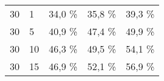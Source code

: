 \begin{table}[!htb]
\begin{tabular}{lllll}
                                                                             &                                                                                                                               &                                                                                                                       &                                                                                                                        &                                                                                                                        \\ \hline
\multicolumn{1}{|l|}{30}                                                     & \multicolumn{1}{l|}{1}                                                                                                        & \multicolumn{1}{l|}{34,0 \%}                                                                                          & \multicolumn{1}{l|}{35,8 \%}                                                                                           & \multicolumn{1}{l|}{39,3 \%}                                                                                           \\ \hline
\multicolumn{1}{|l|}{30}                                                     & \multicolumn{1}{l|}{5}                                                                                                        & \multicolumn{1}{l|}{40,9 \%}                                                                                          & \multicolumn{1}{l|}{47,4 \%}                                                                                           & \multicolumn{1}{l|}{49,9 \%}                                                                                           \\ \hline
\multicolumn{1}{|l|}{30}                                                     & \multicolumn{1}{l|}{10}                                                                                                       & \multicolumn{1}{l|}{46,3 \%}                                                                                          & \multicolumn{1}{l|}{49,5 \%}                                                                                           & \multicolumn{1}{l|}{54,1 \%}                                                                                           \\ \hline
\multicolumn{1}{|l|}{30}                                                     & \multicolumn{1}{l|}{15}                                                                                                       & \multicolumn{1}{l|}{46,9 \%}                                                                                          & \multicolumn{1}{l|}{52,1 \%}                                                                                           & \multicolumn{1}{l|}{56,9 \%}                                                                                           \\ \hline

\end{tabular}
\end{table}
